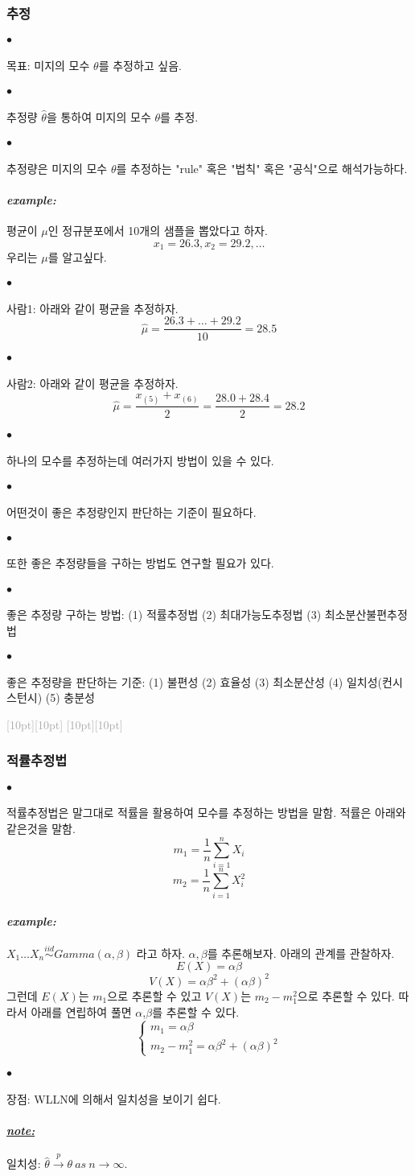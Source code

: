 \documentclass[12pt,oneside,english]{book}
\newcommand{\rdash}{\noindent \textcolor{darkgray}{ \raisebox{-1.9pt}[10pt][10pt]{\leafright} \hrulefill \raisebox{-1.9pt}[10pt][10pt]{\leafright \decofourleft \decothreeleft  \aldineright \decotwo \floweroneleft \decoone}}}
\def\ck{\paragraph{\Large$\bullet$}\Large}
\def\note{\paragraph{\Large\textit{\underline{note:}}}\Large}
\def\ex{\paragraph{\Large\textit{example:}}\Large}
\begin{document}
\subsubsection{추정}
\ck 목표: 미지의 모수 $\theta$를 추정하고 싶음. 
\ck 추정량 $\hat\theta$을 통하여 미지의 모수 $\theta$를 추정. 
\ck 추정량은 미지의 모수 $\theta$를 추정하는 "rule" 혹은 "법칙" 혹은 "공식"으로 해석가능하다. 

\ex 평균이 $\mu$인 정규분포에서 10개의 샘플을 뽑았다고 하자. 
\[
x_1=26.3, x_2=29.2, \dots 
\]
우리는 $\mu$를 알고싶다. 

\ck 사람1: 아래와 같이 평균을 추정하자. 
\[
\hat\mu= \frac{26.3+\dots+29.2}{10}=28.5
\]
\ck 사람2: 아래와 같이 평균을 추정하자. 
\[
\hat\mu= \frac{x_{(5)}+x_{(6)}}{2}=\frac{28.0+28.4}{2}=28.2
\]

\ck 하나의 모수를 추정하는데 여러가지 방법이 있을 수 있다. 

\ck 어떤것이 좋은 추정량인지 판단하는 기준이 필요하다. 

\ck 또한 좋은 추정량들을 구하는 방법도 연구할 필요가 있다. 

\ck 좋은 추정량 구하는 방법: (1) 적률추정법 (2) 최대가능도추정법 (3) 최소분산불편추정법 

\ck 좋은 추정량을 판단하는 기준: (1) 불편성 (2) 효율성 (3) 최소분산성 (4) 일치성(컨시스턴시) (5) 충분성

\rdash 

\subsubsection{적률추정법}

\ck 적률추정법은 말그대로 적률을 활용하여 모수를 추정하는 방법을 말함. 적률은 아래와 같은것을 말함.
\[
m_1=\frac{1}{n}\sum_{i=1}^{n}X_i
\]
\[
m_2=\frac{1}{n}\sum_{i=1}^{n}X_i^2
\]

\ex $X_1\dots X_n \overset{iid}{\sim} Gamma(\alpha,\beta)$ 라고 하자. $\alpha,\beta$를 추론해보자. 아래의 관계를 관찰하자. 
\[
E(X)=\alpha \beta
\]
\[
V(X)=\alpha \beta^2 + (\alpha\beta)^2 
\]
그런데 $E(X)$는 $m_1$으로 추론할 수 있고 $V(X)$는 $m_2-m_1^2$으로 추론할 수 있다. 따라서 아래를 연립하여 풀면 $\alpha$,$\beta$를 추론할 수 있다. 
\[
\begin{cases}
m_1=\alpha \beta \\
m_2-m_1^2=\alpha \beta^2 + (\alpha\beta)^2 
\end{cases}
\]

\ck 장점: WLLN에 의해서 일치성을 보이기 쉽다. 
\note 일치성: $\hat{\theta} \overset{p}{\to} \theta ~ as~  n \to \infty.$ 
\end{document}
